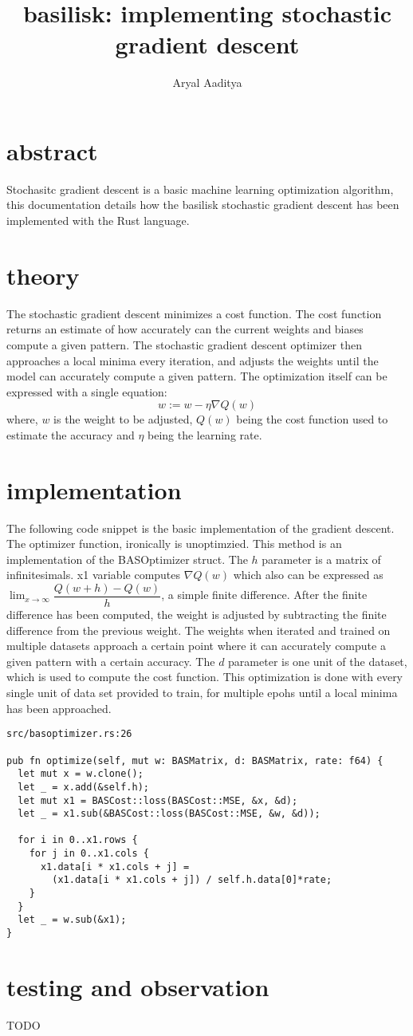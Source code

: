 \documentclass[a4paper,11pt]{article}
\title{\vspace{-1.0cm}basilisk: implementing stochastic gradient descent}
\author{Aryal Aaditya}
\begin{document}
  \maketitle
  \section{abstract}
	Stochasitc gradient descent is a basic machine 
	learning optimization algorithm, this documentation 
  details how the basilisk stochastic gradient descent
  has been implemented with the Rust language.

  \section{theory}
  The stochastic gradient descent minimizes a cost function.
  The cost function returns an estimate of how accurately can the current weights and biases compute a given pattern.
  The stochastic gradient descent optimizer then approaches a local minima every iteration, and adjusts the weights until
  the model can accurately compute a given pattern. The optimization itself can be expressed with a single equation:
  \begin{equation}
    w := w - \eta \nabla Q(w) 
  \end{equation}
  where, \(w\) is the weight to be adjusted, \(Q(w)\) being the 
  cost function used to estimate the accuracy and \(\eta\) being the learning rate.
  
  \section{implementation}
  The following code snippet is the basic implementation of the gradient descent. 
  The optimizer function, ironically is unoptimzied. 
  This method is an implementation of the BASOptimizer struct. The \(h\) parameter is a matrix of infinitesimals.
  x1 variable computes \(\nabla Q(w)\) which also can be expressed as
  \(\lim_{x \to \infty}\dfrac{Q(w+h)-Q(w)}{h}\), a simple finite difference.
  After the finite difference has been computed, the weight is adjusted by subtracting the finite difference from the previous weight. The weights when iterated and trained on multiple datasets approach a certain point where it can accurately compute a given pattern with a certain accuracy. 
  The \(d\) parameter is one unit of the dataset, which is used to compute the 
  cost function. This optimization is done with every single unit of data set provided to train, for multiple epohs until a local minima has been approached.
  \begin{verbatim}
src/basoptimizer.rs:26

pub fn optimize(self, mut w: BASMatrix, d: BASMatrix, rate: f64) {
  let mut x = w.clone();
  let _ = x.add(&self.h);
  let mut x1 = BASCost::loss(BASCost::MSE, &x, &d);
  let _ = x1.sub(&BASCost::loss(BASCost::MSE, &w, &d));

  for i in 0..x1.rows {
    for j in 0..x1.cols {
      x1.data[i * x1.cols + j] = 
        (x1.data[i * x1.cols + j]) / self.h.data[0]*rate;
    }
  }
  let _ = w.sub(&x1);
}
    \end{verbatim}
  
    \section{testing and observation}
    TODO
\end{document}
